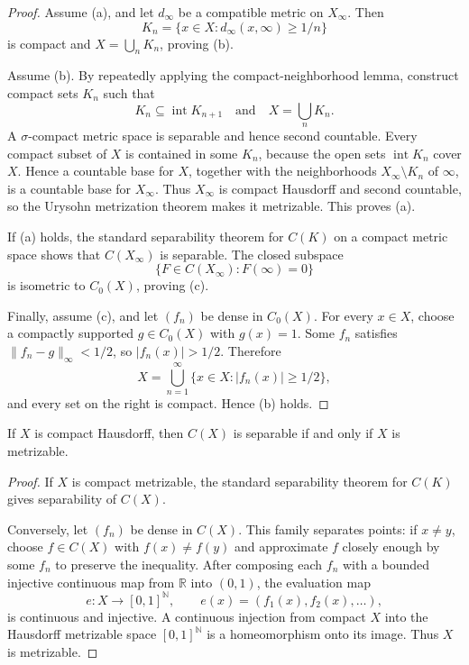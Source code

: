 \begin{proof}
Assume (a), and let $d_\infty$ be a compatible metric on $X_\infty$. Then
\[
K_n=\{x\in X:d_\infty(x,\infty)\geq1/n\}
\]
is compact and $X=\bigcup_nK_n$, proving (b).

Assume (b). By repeatedly applying the compact-neighborhood lemma, construct
compact sets $K_n$ such that
\[
K_n\subseteq\operatorname{int}K_{n+1}
\quad\text{and}\quad
X=\bigcup_nK_n.
\]
A $\sigma$-compact metric space is separable and hence second countable.
Every compact subset of $X$ is contained in some $K_n$, because the open sets
$\operatorname{int}K_n$ cover $X$. Hence a countable base for $X$, together
with the neighborhoods $X_\infty\setminus K_n$ of $\infty$, is a countable
base for $X_\infty$. Thus $X_\infty$ is compact Hausdorff and second
countable, so the Urysohn metrization theorem makes it metrizable. This proves (a).

If (a) holds, the standard separability theorem for $C(K)$ on a compact metric
space shows that $C(X_\infty)$ is separable. The closed subspace
\[
\{F\in C(X_\infty):F(\infty)=0\}
\]
is isometric to $C_0(X)$, proving (c).

Finally, assume (c), and let $(f_n)$ be dense in $C_0(X)$. For every $x\in X$,
choose a compactly supported $g\in C_0(X)$ with $g(x)=1$. Some $f_n$ satisfies
$\|f_n-g\|_\infty<1/2$, so $|f_n(x)|>1/2$. Therefore
\[
X=\bigcup_{n=1}^{\infty}
\{x\in X:|f_n(x)|\geq1/2\},
\]
and every set on the right is compact. Hence (b) holds.
\end{proof}

\begin{cor}
If $X$ is compact Hausdorff, then $C(X)$ is separable if and only if $X$ is
metrizable.
\end{cor}

\begin{proof}
If $X$ is compact metrizable, the standard separability theorem for $C(K)$
gives separability of $C(X)$.

Conversely, let $(f_n)$ be dense in $C(X)$. This family separates points: if
$x\neq y$, choose $f\in C(X)$ with $f(x)\neq f(y)$ and approximate $f$ closely
enough by some $f_n$ to preserve the inequality. After composing each $f_n$
with a bounded injective continuous map from $\mathbb{R}$ into $(0,1)$, the
evaluation map
\[
e:X\longrightarrow[0,1]^{\mathbb{N}},
\qquad
e(x)=(f_1(x),f_2(x),\ldots),
\]
is continuous and injective. A continuous injection from compact $X$ into the
Hausdorff metrizable space $[0,1]^{\mathbb{N}}$ is a homeomorphism onto its
image. Thus $X$ is metrizable.
\end{proof}

